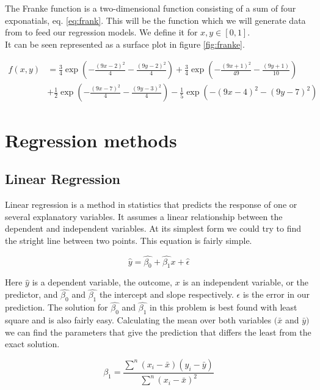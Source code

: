 \documentclass[a4paper,12pt, english]{article}
\begin{document}
The Franke function is a two-dimensional function consisting of a sum of four exponatials, eq. \ref{eq:frank}. This will be the function which we will generate data from to feed our regression models. We define it for $x, y \in [0,1]$. \\
It can be seen represented as a surface plot in figure \ref{fig:franke}.

\begin{align}
f(x,y) &= \frac{3}{4}\exp{\left(-\frac{(9x-2)^2}{4} - \frac{(9y-2)^2}{4}\right)}+\frac{3}{4}\exp{\left(-\frac{(9x+1)^2}{49}- \frac{(9y+1)}{10}\right)} \nonumber \\
&+\frac{1}{2}\exp{\left(-\frac{(9x-7)^2}{4} - \frac{(9y-3)^2}{4}\right)} -\frac{1}{5}\exp{\left(-(9x-4)^2 - (9y-7)^2\right) } \label{eq:frank}
\end{align}




\section*{Regression methods}

\subsection*{Linear Regression}

Linear regression is a method in statistics that predicts the response of one or several explanatory variables. It assumes a linear relationship between the dependent and independent variables. At its simplest form we could try to find the stright line between two points. This equation is fairly simple.

\begin{equation}
\hat{y} = \hat{\beta_{0}} + \hat{\beta_{1}}x + \hat{\epsilon}
\end{equation}

Here $\hat{y}$ is a dependent variable, the outcome, $x$ is an independent variable, or the predictor, and $\hat{\beta_{0}}$ and $\hat{\beta_{1}}$ the intercept and slope respectively. $\epsilon$ is the error in our prediction. The solution for $\hat{\beta_{0}}$ and $\hat{\beta_{1}}$ in this problem is best found with least square and is also fairly easy. Calculating the mean over both variables $(\bar{x}$ and $\bar{y})$ we can find the parameters that give the prediction that differs the least from the exact solution.

\begin{equation}
\beta_1 = \frac{\sum^n (x_i - \bar{x})(y_i - \bar{y})}{\sum^n (x_i - \bar{x})^2}
\end{equation}
\end{document}
